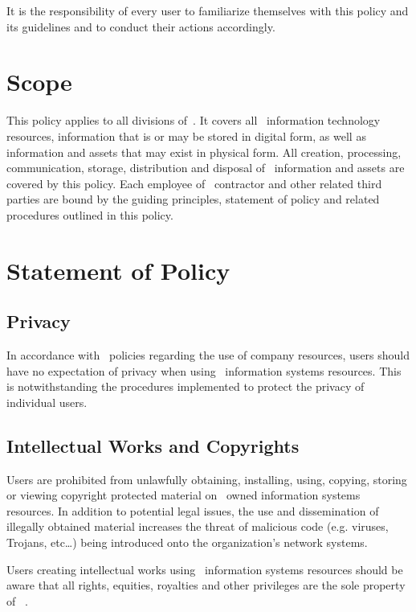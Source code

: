 \documentclass[use]{policy}
\begin{document}
		It is the responsibility of every user to familiarize themselves with this policy and its guidelines and to conduct their actions accordingly.
		
	
	\section{Scope}
	
		This policy applies to all divisions of \theOrganization\,.  It covers all \theOrganization\ information technology resources, information that is or may be stored in digital form, as well as information and assets that may exist in physical form.  All creation, processing, communication, storage, distribution and disposal of \theOrganization\ information and assets are covered by this policy.  Each employee of \theOrganization\, contractor and other related third parties are bound by the guiding principles, statement of policy and related procedures outlined in this policy. 
	
	
	\section{Statement of Policy}
	
		\subsection{Privacy}
			In accordance with \theOrganization\ policies regarding the use of company resources, users should have no expectation of privacy when using \theOrganization\  information systems resources.  This is notwithstanding the procedures implemented to protect the privacy of individual users.
		
		\subsection{Intellectual Works and Copyrights}
			Users are prohibited from unlawfully obtaining, installing, using, copying, storing or viewing copyright protected material on \theOrganization\  owned information systems resources.  In addition to potential legal issues, the use and dissemination of illegally obtained material increases the threat of malicious code (e.g. viruses, Trojans, etc…) being introduced onto the organization’s network systems. 
		 
			Users creating intellectual works using \theOrganization\  information systems resources should be aware that all rights, equities, royalties and other privileges are the sole property of \theOrganization\ .  
		
\end{document}
